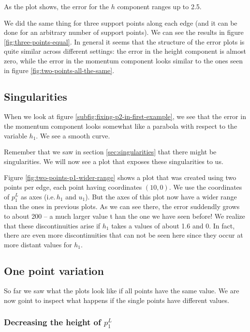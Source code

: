 \documentclass{article}
\begin{document}
As the plot shows, the error for the $h$ component ranges up to 2.5.

We did the same thing for three support points along each edge (and it can be done for an arbitrary number of support points). We can see the results in figure \ref{fig:three-points-equal}. In general it seems that the structure of the error plots is quite similar across different settings: the error in the height component is almost zero, while the error in the momentum component looks similar to the ones seen in figure \ref{fig:two-points-all-the-same}.



\subsection{Singularities}
\label{sec:plots-discontinuities}

When we look at figure \ref{subfig:fixing-p2-in-first-example}, we see that the error in the momentum component looks somewhat like a parabola with respect to the variable $h_1$. We see a smooth curve.

Remember that we saw in section \ref{sec:singularities} that there might be singularities. We will now see a plot that exposes these singularities to us.



Figure \ref{fig:two-points-p1-wider-range} shows a plot that was created using two points per edge, each point having coordinates $(10,0)$. We use the coordinates of $p_1^L$ as axes (i.e.\,$h_1$ and $u_1$). But the axes of this plot now have a wider range than the ones in previous plots. As we can see there, the error suddendly grows to about 200 -- a much larger value t han the one we have seen before! We realize that these discontinuities arise if $h_1$ takes a values of about 1.6 and 0. In fact, there are even more discontinuities that can not be seen here since they occur at more distant values for $h_1$.

\subsection{One point variation}
\label{sec:one-point-variation}

So far we saw what the plots look like if all points have the same value. We are now goint to inspect what happens if the single points have different values.

\subsubsection{\texorpdfstring{Decreasing the height of $p_1^L$}{Decreasing the height of p1L}}
\label{sec:decreasing-height-p1}
\end{document}
